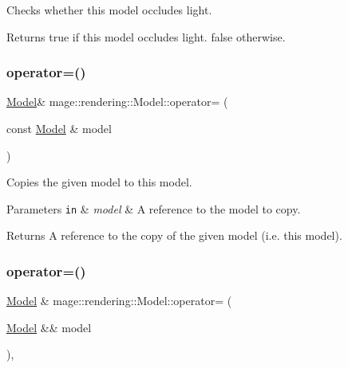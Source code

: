 Checks whether this model occludes light.

\begin{DoxyReturn}{Returns}
{\ttfamily true} if this model occludes light. {\ttfamily false} otherwise. 
\end{DoxyReturn}
\mbox{\label{classmage_1_1rendering_1_1_model_aa7edda6386fa2ae0638e5c46dccff016}} 
\subsubsection{\texorpdfstring{operator=()}{operator=()}\hspace{0.1cm}{\footnotesize\ttfamily [1/2]}}
{\footnotesize\ttfamily \mbox{\hyperlink{classmage_1_1rendering_1_1_model}{Model}}\& mage\+::rendering\+::\+Model\+::operator= (\begin{DoxyParamCaption}\item[{const \mbox{\hyperlink{classmage_1_1rendering_1_1_model}{Model}} \&}]{model }\end{DoxyParamCaption})\hspace{0.3cm}{\ttfamily [delete]}}

Copies the given model to this model.


\begin{DoxyParams}[1]{Parameters}
\mbox{\tt in}  & {\em model} & A reference to the model to copy. \\
\hline
\end{DoxyParams}
\begin{DoxyReturn}{Returns}
A reference to the copy of the given model (i.\+e. this model). 
\end{DoxyReturn}
\mbox{\label{classmage_1_1rendering_1_1_model_a2b374cb908e39da8ff35ea5c17ce640d}} 
\subsubsection{\texorpdfstring{operator=()}{operator=()}\hspace{0.1cm}{\footnotesize\ttfamily [2/2]}}
{\footnotesize\ttfamily \mbox{\hyperlink{classmage_1_1rendering_1_1_model}{Model}} \& mage\+::rendering\+::\+Model\+::operator= (\begin{DoxyParamCaption}\item[{\mbox{\hyperlink{classmage_1_1rendering_1_1_model}{Model}} \&\&}]{model }\end{DoxyParamCaption})\hspace{0.3cm}{\ttfamily [default]}, {\ttfamily [noexcept]}}

